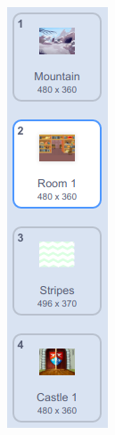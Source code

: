 \documentclass[10pt, a4paper]{article}
\begin{document}
\begin{enumerate}
\begin{figure}[htbp]
\begin{minipage}[t]{.35\textwidth}
\begin{minipage}[t]{.18\textwidth}
                    \includegraphics[width=.7\textwidth]{6-1.png}

\end{minipage}
\end{minipage}
\end{figure}
\end{enumerate}
\end{document}
